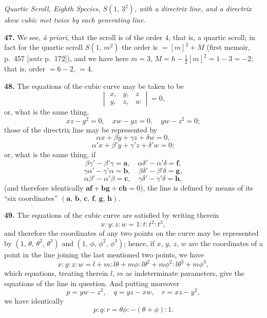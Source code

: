 \documentclass[11pt,a4paper]{article}
\begin{document}
\bigskip

\begin{center}
\textit{Quartic Scroll, Eighth Species, $S(1,\,3^{2})$, with a directrix line, and a directrix skew cubic met twice by each generating line.}
\end{center}

\textbf{47.} We see, \textit{\`a priori}, that the scroll is of the order $4$, that is, a quartic scroll; in fact for the quartic scroll $S(1,\,m^{2})$ the order is $= [m]^{2} + M$ (first memoir, p.~457 [\textit{ante} p.~172]), and we have here $m = 3$, $M = h - \tfrac{1}{2}[m]^{2} = 1 - 3 = -2$; that is, order $= 6 - 2$, $= 4$.

\medskip

\textbf{48.} The equations of the cubic curve may be taken to be
\[
\begin{vmatrix} x, & y, & z \\ y, & z, & w \end{vmatrix} = 0,
\]
or, what is the same thing,
\[
xz - y^{2} = 0,\quad xw - yz = 0,\quad yw - z^{2} = 0;
\]
those of the directrix line may be represented by
\[
\alpha x + \beta y + \gamma z + \delta w = 0,
\]
\[
\alpha' x + \beta' y + \gamma' z + \delta' w = 0;
\]
or, what is the same thing, if
\[
\beta\gamma' - \beta'\gamma = \mathbf{a},\quad \alpha\delta' - \alpha'\delta = \mathbf{f},
\]
\[
\gamma\alpha' - \gamma'\alpha = \mathbf{b},\quad \beta\delta' - \beta'\delta = \mathbf{g},
\]
\[
\alpha\beta' - \alpha'\beta = \mathbf{c},\quad \gamma\delta' - \gamma'\delta = \mathbf{h},
\]
(and therefore identically $\mathbf{af + bg + ch} = 0$), the line is defined by means of its ``six coordinates'' $(\mathbf{a},\,\mathbf{b},\,\mathbf{c},\,\mathbf{f},\,\mathbf{g},\,\mathbf{h})$.

\medskip

\textbf{49.} The equations of the cubic curve are satisfied by writing therein
\[
x : y : z : w = 1 : t : t^{2} : t^{3},
\]
and therefore the coordinates of any two points on the curve may be represented by $(1,\,\theta,\,\theta^{2},\,\theta^{3})$ and $(1,\,\phi,\,\phi^{2},\,\phi^{3})$; hence, if $x,\,y,\,z,\,w$ are the coordinates of a point in the line joining the last mentioned two points, we have
\[
x : y : z : w = l + m : l\theta + m\phi : l\theta^{2} + m\phi^{2} : l\theta^{3} + m\phi^{3},
\]
which equations, treating therein $l,\,m$ as indeterminate parameters, give the equations of the line in question. And putting moreover
\[
p = yw - z^{2},\quad q = yz - xw,\quad r = xz - y^{2},
\]
we have identically
\[
p : q : r = \theta\phi : -(\theta + \phi) : 1.
\]
\end{document}
